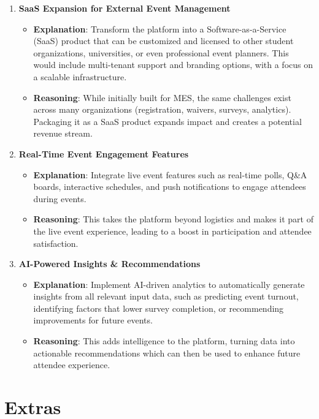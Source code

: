 \documentclass{article}
\begin{document}
\begin{enumerate}
    \item \textbf{SaaS Expansion for External Event Management}
    \begin{itemize}
        \item \textbf{Explanation}: Transform the platform into a Software-as-a-Service (SaaS) product that can be customized and licensed to other student organizations, universities, or even professional event planners. This would include multi-tenant support and branding options, with a focus on a scalable infrastructure.
        \item \textbf{Reasoning}: While initially built for MES, the same challenges exist across many organizations (registration, waivers, surveys, analytics). Packaging it as a SaaS product expands impact and creates a potential revenue stream.
    \end{itemize}

        \item \textbf{Real-Time Event Engagement Features}
    \begin{itemize}
        \item \textbf{Explanation}: Integrate live event features such as real-time polls, Q\&A boards, interactive schedules, and push notifications to engage attendees during events.
        \item \textbf{Reasoning}: This takes the platform beyond logistics and makes it part of the live event experience, leading to a boost in participation and attendee satisfaction.
    \end{itemize}

        \item \textbf{AI-Powered Insights \& Recommendations}
    \begin{itemize}
        \item \textbf{Explanation}: Implement AI-driven analytics to automatically generate insights from all relevant input data, such as predicting event turnout, identifying factors that lower survey completion, or recommending improvements for future events.
        \item \textbf{Reasoning}: This adds intelligence to the platform, turning data into actionable recommendations which can then be used to enhance future attendee experience.
    \end{itemize}
\end{enumerate}


\section{Extras}
\end{document}
